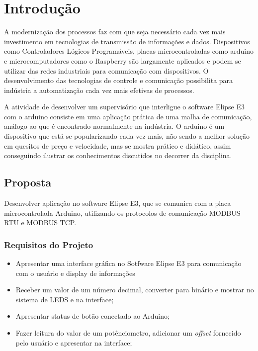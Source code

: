 
\chapter[Introdução]{Introdução}

A modernização dos processos faz com que seja necessário cada vez mais investimento em tecnologias de transmissão de informações e dados. Dispositivos como Controladores Lógicos Programáveis, placas microcontroladas como arduino e microcomputadores como o Raspberry são largamente aplicados e podem se utilizar das redes industriais para comunicação com dispositivos. O desenvolvimento das tecnologias de controle e comunicação possibilita para indústria a automatização cada vez mais efetivas de processos.

A atividade de desenvolver um supervisório que interligue o software Elipse E3 com o arduino consiste em uma aplicação prática de uma malha de comunicação, análogo ao que é encontrado normalmente na indústria. O arduino é um dispositivo que está se popularizando cada vez mais, não sendo a melhor solução em quesitos de preço e velocidade, mas se mostra prático e didático, assim conseguindo ilustrar os conhecimentos discutidos no decorrer da disciplina.



\section{Proposta}\label{sec:motivacao}
Desenvolver aplicação no software Elipse E3, que se comunica com a placa microcontrolada Arduino, utilizando os protocolos de comunicação MODBUS RTU e MODBUS TCP.

\subsection{Requisitos do Projeto}
\begin{itemize}
\item Apresentar uma interface gráfica no Sotfware Elipse E3 para comunicação com o usuário e display de informações
\item Receber um valor de um número decimal, converter para binário e mostrar no sistema de LEDS e na interface;
\item Apresentar status de botão conectado ao Arduino;
\item Fazer leitura do valor de um potênciometro, adicionar um \textit{offset} fornecido pelo usuário e apresentar na interface;
\end{itemize}
